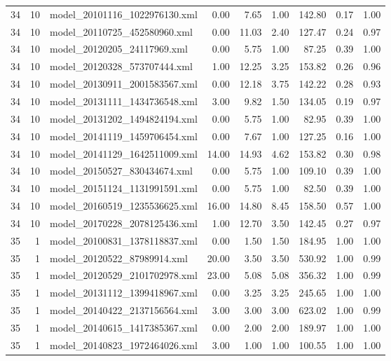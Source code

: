 \begin{table}[ht]
\begin{tabular}{rrlrrrrrr}
   34 &  10 & model\_20101116\_1022976130.xml & 0.00 & 7.65 & 1.00 & 142.80 & 0.17 & 1.00 \\ 
   34 &  10 & model\_20110725\_452580960.xml & 0.00 & 11.03 & 2.40 & 127.47 & 0.24 & 0.97 \\ 
   34 &  10 & model\_20120205\_24117969.xml & 0.00 & 5.75 & 1.00 & 87.25 & 0.39 & 1.00 \\ 
   34 &  10 & model\_20120328\_573707444.xml & 1.00 & 12.25 & 3.25 & 153.82 & 0.26 & 0.96 \\ 
   34 &  10 & model\_20130911\_2001583567.xml & 0.00 & 12.18 & 3.75 & 142.22 & 0.28 & 0.93 \\ 
   34 &  10 & model\_20131111\_1434736548.xml & 3.00 & 9.82 & 1.50 & 134.05 & 0.19 & 0.97 \\ 
   34 &  10 & model\_20131202\_1494824194.xml & 0.00 & 5.75 & 1.00 & 82.95 & 0.39 & 1.00 \\ 
   34 &  10 & model\_20141119\_1459706454.xml & 0.00 & 7.67 & 1.00 & 127.25 & 0.16 & 1.00 \\ 
   34 &  10 & model\_20141129\_1642511009.xml & 14.00 & 14.93 & 4.62 & 153.82 & 0.30 & 0.98 \\ 
   34 &  10 & model\_20150527\_830434674.xml & 0.00 & 5.75 & 1.00 & 109.10 & 0.39 & 1.00 \\ 
   34 &  10 & model\_20151124\_1131991591.xml & 0.00 & 5.75 & 1.00 & 82.50 & 0.39 & 1.00 \\ 
   34 &  10 & model\_20160519\_1235536625.xml & 16.00 & 14.80 & 8.45 & 158.50 & 0.57 & 1.00 \\ 
   34 &  10 & model\_20170228\_2078125436.xml & 1.00 & 12.70 & 3.50 & 142.45 & 0.27 & 0.97 \\ 
   35 &   1 & model\_20100831\_1378118837.xml & 0.00 & 1.50 & 1.50 & 184.95 & 1.00 & 1.00 \\ 
   35 &   1 & model\_20120522\_87989914.xml & 20.00 & 3.50 & 3.50 & 530.92 & 1.00 & 0.99 \\ 
   35 &   1 & model\_20120529\_2101702978.xml & 23.00 & 5.08 & 5.08 & 356.32 & 1.00 & 0.99 \\ 
   35 &   1 & model\_20131112\_1399418967.xml & 0.00 & 3.25 & 3.25 & 245.65 & 1.00 & 1.00 \\ 
   35 &   1 & model\_20140422\_2137156564.xml & 3.00 & 3.00 & 3.00 & 623.02 & 1.00 & 0.99 \\ 
   35 &   1 & model\_20140615\_1417385367.xml & 0.00 & 2.00 & 2.00 & 189.97 & 1.00 & 1.00 \\ 
   35 &   1 & model\_20140823\_1972464026.xml & 3.00 & 1.00 & 1.00 & 100.55 & 1.00 & 1.00 \\ 

\end{tabular}
\end{table}
